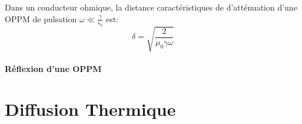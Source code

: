 \documentclass[11pt,a4paper,fleqn,pdftex]{report}
\begin{document}
\begin{itheorem}
   Dans un conducteur ohmique, la distance caractéristiques de d'atténuation d'une \gls{OPPM} de pulsation $\omega \ll \frac{\gamma}{\epsilon_0}$ est: 
   \begin{equation}
   \delta = \sqrt{\dfrac{2}{\mu_0 \gamma \omega}}
   \end{equation}
\end{itheorem}
\subsubsection{Réflexion d'une \gls{OPPM}} %
\label{ssub:reflexion_OPPM_metal}

\chapter{Diffusion Thermique}
\end{document}
